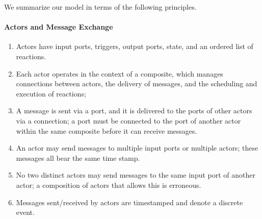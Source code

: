 \documentclass[sigconf]{acmart}
\newcommand{\marten}[1]{\mynote{Marten}{#1}{cyan}}%
\begin{document}





We summarize our model in terms of the following principles.

\paragraph{Actors and Message Exchange}
\begin{enumerate}
	\item Actors have input ports, triggers, output ports, state, and an ordered list of reactions.
	\item Each actor operates in the context of a composite, which manages connections between actors, the delivery of messages, and the scheduling and execution of reactions;
	\item A message is sent via a port, and it is delivered to the ports of other actors via a connection; a port must be connected to the port of another actor within the same composite before it can receive messages.
	\item An actor may send messages to multiple input ports or multiple actors;
	these messages all bear the same time stamp.
	\item No two distinct actors may send messages to the same input port of another actor;
	a composition of actors that allows this is erroneous.
	\item Messages sent/received by actors are timestamped and denote a discrete event.
\end{enumerate}
\end{document}
